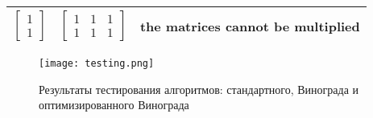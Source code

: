 \begin{table}[]
\begin{tabular}{|c|c|c|}
                $\begin{bmatrix} 1 \\ 1 \end{bmatrix}$                   & $\begin{bmatrix} 1 & 1 & 1 \\ 1 & 1 & 1 \end{bmatrix}$ & the matrices cannot be multiplied                       \\ \hline
                \end{tabular}
            \label{table:testing}
        \end{table}
        
        \begin{figure}[h!]
            \centering
            \texttt{[image: testing.png]}
            \caption{Результаты тестирования алгоритмов: стандартного, Винограда и оптимизированного Винограда}
            \label{png:testing:result}
        \end{figure}
\newpage